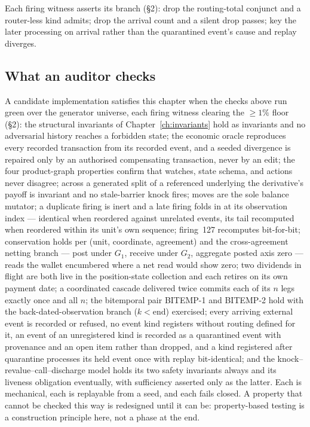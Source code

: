 \documentclass[11pt,a4paper]{article}
\begin{document}
Each firing witness asserts its branch (\S 2): drop the routing-total conjunct and a
router-less kind admits; drop the arrival count and a silent drop passes; key the later
processing on arrival rather than the quarantined event's cause and replay diverges.

\subsection{What an auditor checks}

A candidate implementation satisfies this chapter when the checks above run green over the
generator universe, each firing witness clearing the $\ge 1\%$ floor (\S 2): the structural
invariants of Chapter~\ref{ch:invariants} hold as
invariants and no adversarial history reaches a forbidden state; the economic oracle
reproduces every recorded transaction from its recorded event, and a seeded divergence is
repaired only by an authorised compensating transaction, never by an edit; the four product-graph properties confirm that
watches, state schema, and actions never disagree; across a generated split of a referenced
underlying the derivative's payoff is invariant and no stale-barrier knock fires; moves are the
sole balance mutator; a duplicate firing is inert and a late firing folds in at its observation
index --- identical when reordered against unrelated events, its tail recomputed when reordered
within its unit's own sequence; firing~127 recomputes bit-for-bit; conservation holds per (unit,
coordinate, agreement) and the cross-agreement netting branch --- post under $G_1$, receive
under $G_2$, aggregate posted axis zero --- reads the wallet encumbered where a net read would
show zero; two dividends in flight are both live in the position-state collection and each
retires on its own payment date; a coordinated cascade delivered twice commits each of its $n$
legs exactly once and all $n$; the bitemporal pair BITEMP-1 and BITEMP-2 hold with the
back-dated-observation branch ($k<\text{end}$) exercised; every arriving external event is
recorded or refused, no event kind registers without routing defined for it, an event of an
unregistered kind is recorded as a quarantined event with provenance and an open item rather than
dropped, and a kind registered after quarantine processes its held event once with replay
bit-identical; and the
knock--revalue--call--discharge model holds its two safety invariants
always and its liveness obligation eventually, with sufficiency asserted only as the latter.
Each is mechanical, each is replayable from a seed, and each fails closed. A property that
cannot be checked this way is redesigned until it can be: property-based testing is a
construction principle here, not a phase at the end.
\end{document}
